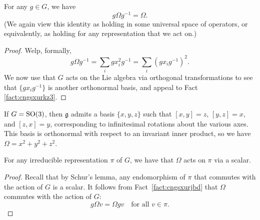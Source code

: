 \documentclass[reqno]{amsart} 
\begin{document}
\begin{fact}\label{fact:cngsxurjbd}
  For any $g \in G$, we have
  \begin{equation*}
    g \Omega g^{-1} = \Omega.
  \end{equation*}
  (We again view this identity as holding in some universal space of operators, or equivalently, as holding for any representation that we act on.)
\end{fact}
\begin{proof}
  Welp, formally,
  \begin{equation*}
    g \Omega g^{-1} = \sum_i g x_i^2 g^{-1} = \sum_i (g x_i g^{-1})^2.
  \end{equation*}
  We now use that $G$ acts on the Lie algebra via orthogonal transformations to see that $\{g x_i g^{-1}\}$ is another orthonormal basis, and appeal to Fact \ref{fact:cngsxurkz3}.
\end{proof}

\begin{example}\label{example:cngsxuwa7f}
  If $G = \operatorname{SO}(3)$, then $\mathfrak{g}$ admits a basis $\{x, y, z\}$ such that $[x,y] = z$, $[y,z] = x$, and $[z,x] = y$, corresponding to infinitesimal rotations about the various axes.  This basis is orthonormal with respect to an invariant inner product, so we have $\Omega = x^2 + y^2 + z^2$.
\end{example}

\begin{fact}
  For any irreducible representation $\pi$ of $G$, we have that $\Omega$ acts on $\pi$ via a scalar.
\end{fact}
\begin{proof}
  Recall that by Schur's lemma, any endomorphism of $\pi$ that commutes with the action of $G$ is a scalar.  It follows from Fact~\ref{fact:cngsxurjbd} that $\Omega$ commutes with the action of $G$:
  \begin{equation*}
    g \Omega v = \Omega g v \quad \text{for all } v \in \pi.
  \end{equation*}
\end{proof}

{} 
\end{document}
